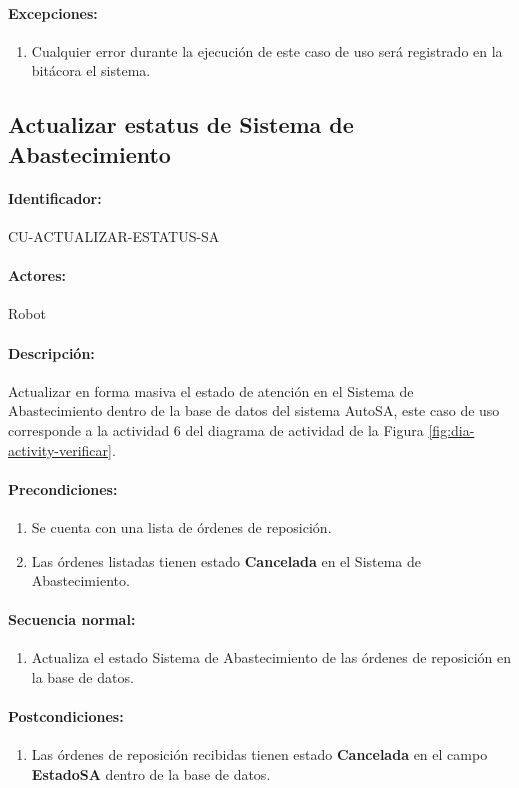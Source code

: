 \paragraph{Excepciones:}
\begin{enumerate}
  \item Cualquier error durante la ejecución de este caso de uso será registrado en la bitácora el sistema.
\end{enumerate}


\subsection{Actualizar estatus de Sistema de Abastecimiento}\label{cu-actualizar-estatus-sa}
\paragraph{Identificador:}
CU-ACTUALIZAR-ESTATUS-SA
\paragraph{Actores:}
Robot
\paragraph{Descripción:}
Actualizar en forma masiva el estado de atención en el Sistema de Abastecimiento dentro de la base de datos del sistema AutoSA, este caso de uso corresponde a la actividad 6 del diagrama de actividad de la Figura \ref{fig:dia-activity-verificar}.
\paragraph{Precondiciones:}
\begin{enumerate}
  \item Se cuenta con una lista de órdenes de reposición.
  \item Las órdenes listadas tienen estado \textbf{Cancelada} en el Sistema de Abastecimiento. 
\end{enumerate}
\paragraph{Secuencia normal:}
\begin{enumerate}
  \item Actualiza el estado Sistema de Abastecimiento de las órdenes de reposición en la base de datos.
\end{enumerate}
\paragraph{Postcondiciones:}
\begin{enumerate}
  \item Las órdenes de reposición recibidas tienen estado \textbf{Cancelada} en el campo \textbf{EstadoSA} dentro de la base de datos.
\end{enumerate}
